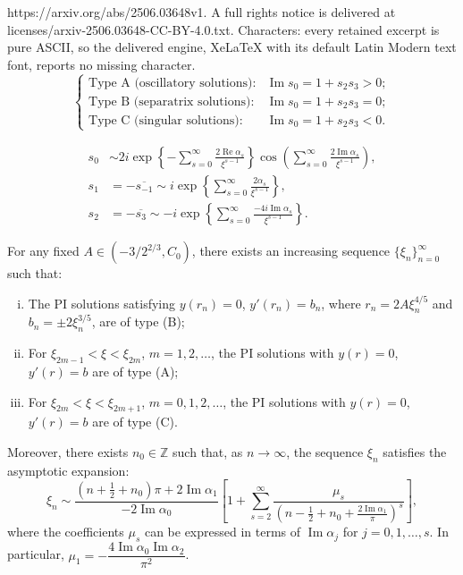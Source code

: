 \documentclass[10pt,a4paper]{amsart}
\renewcommand\Im{\operatorname{Im}}
\renewcommand\Re{\operatorname{Re}}
\begin{document}
https://arxiv.org/abs/2506.03648v1. A full rights notice is delivered at licenses/arxiv-2506.03648-CC-BY-4.0.txt. Characters: every retained excerpt is pure ASCII, so the delivered engine, XeLaTeX with its default Latin Modern text font, reports no missing character.
\begin{equation}\label{eq-classifed-by-stokes}
\begin{cases}
\text{Type A (oscillatory solutions)}: & \Im s_{0}=1+s_{2}s_{3}>0;\\
\text{Type B (separatrix solutions)}: & \Im s_{0}=1+s_{2}s_{3}=0;\\
\text{Type C (singular solutions)}:  & \Im s_{0}=1+s_{2}s_{3}<0.
\end{cases}
\end{equation}

\begin{equation}\label{eq-stokes-full-asymptotic-case-II}
\begin{aligned}
s_{0} &\sim 2i \exp\left\{ -\sum_{s=0}^{\infty} \frac{2\Re \alpha_{s}}{\xi^{s-1}} \right\}
\cos\left( \sum_{s=0}^{\infty} \frac{2\Im \alpha_{s}}{\xi^{s-1}} \right), \\
s_{1} &= -\overline{s_{-1}} \sim i \exp\left\{ \sum_{s=0}^{\infty} \frac{2\alpha_{s}}{\xi^{s-1}} \right\}, \\
s_{2} &= -\overline{s_{3}} \sim -i \exp\left\{ \sum_{s=0}^{\infty} \frac{-4i\Im \alpha_{s}}{\xi^{s-1}} \right\}.
\end{aligned}
\end{equation}

\begin{corollary}\label{cor-classification-1}
For any fixed \( A \in (-3/2^{2/3}, C_{0}) \), there exists an increasing sequence \( \{\xi_{n}\}_{n=0}^\infty \) such that:
\begin{enumerate}[(i)]
\item The PI solutions satisfying \( y(r_n) = 0 \), \( y'(r_n) = b_n \), where \( r_n = 2A\xi_n^{4/5} \) and \( b_n = \pm 2\xi_n^{3/5} \), are of type (B);
\item For \( \xi_{2m-1} < \xi < \xi_{2m} \), \( m = 1, 2, \ldots \), the PI solutions with \( y(r) = 0 \), \( y'(r) = b \) are of type (A);
\item For \( \xi_{2m} < \xi < \xi_{2m+1} \), \( m = 0, 1, 2, \ldots \), the PI solutions with \( y(r) = 0 \), \( y'(r) = b \) are of type (C).
\end{enumerate}

Moreover, there exists \( n_{0} \in \mathbb{Z} \) such that, as \( n \to \infty \), the sequence \( \xi_{n} \) satisfies the asymptotic expansion:
\begin{equation}\label{eq-asym-xi-n}
\xi_{n} \sim \frac{\left(n + \frac{1}{2} + n_{0}\right)\pi + 2\Im \alpha_{1}}{-2\Im \alpha_{0}} \left[ 1 + \sum_{s=2}^{\infty} \frac{\mu_{s}}{\left(n - \frac{1}{2} + n_{0} + \frac{2\Im \alpha_{1}}{\pi} \right)^{s}} \right],
\end{equation}
where the coefficients \( \mu_{s} \) can be expressed in terms of \( \Im \alpha_{j} \) for \( j = 0, 1, \ldots, s \). In particular, \( \mu_{1} = -\dfrac{4\Im \alpha_{0} \Im \alpha_{2}}{\pi^{2}} \).
\end{corollary}
\end{document}
